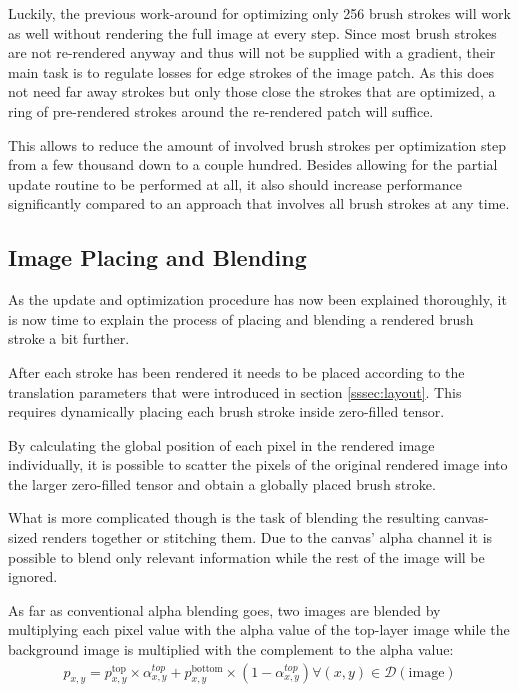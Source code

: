 Luckily, the previous work-around for optimizing only 256 brush strokes will work
as well without rendering the full image at every step.
Since most brush strokes are not re-rendered anyway and thus will not be supplied with
a gradient, their main task is to regulate losses for edge strokes of the image patch.
As this does not need far away strokes but only those close the strokes that are
optimized, a ring of pre-rendered strokes around the re-rendered patch will suffice.

This allows to reduce the amount of involved brush strokes per optimization step
from a few thousand down to a couple hundred.
Besides allowing for the partial update routine to be performed at all, it also
should increase performance significantly compared to an approach that involves
all brush strokes at any time.

\subsection{Image Placing and Blending}
As the update and optimization procedure has now been explained thoroughly, it is
now time to explain the process of placing and blending a rendered brush stroke a
bit further.

After each stroke has been rendered it needs to be placed according to the translation
parameters that were introduced in section \ref{sssec:layout}.
This requires dynamically placing each brush stroke inside zero-filled tensor.

By calculating the global position of each pixel in the rendered image individually,
it is possible to scatter the pixels of the original rendered image into the larger
zero-filled tensor and obtain a globally placed brush stroke.

What is more complicated though is the task of blending the resulting canvas-sized
renders together or stitching them.
Due to the canvas' alpha channel it is possible to blend only relevant information
while the rest of the image will be ignored.

As far as conventional alpha blending goes, two images are blended by multiplying
each pixel value with the alpha value of the top-layer image while the background
image is multiplied with the complement to the alpha value:
\begin{align}
    p_{x,y} = p^{\text{top}}_{x, y} \times \alpha^{top}_{x, y}
    + p^{\text{bottom}}_{x, y} \times (1 - \alpha^{top}_{x, y})
    \forall (x, y) \in \mathcal{D}(\text{image})
\end{align}


